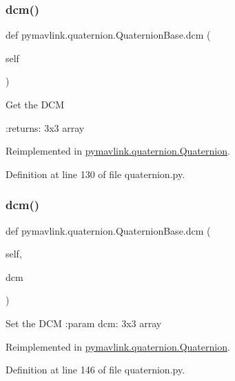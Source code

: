 \subsubsection{\texorpdfstring{dcm()}{dcm()}\hspace{0.1cm}{\footnotesize\ttfamily [1/2]}}
{\footnotesize\ttfamily def pymavlink.\+quaternion.\+Quaternion\+Base.\+dcm (\begin{DoxyParamCaption}\item[{}]{self }\end{DoxyParamCaption})}

\begin{DoxyVerb}Get the DCM

:returns: 3x3 array
\end{DoxyVerb}
 

Reimplemented in \mbox{\hyperlink{classpymavlink_1_1quaternion_1_1Quaternion_a8c596178af38be093dd787c609d7da09}{pymavlink.\+quaternion.\+Quaternion}}.



Definition at line 130 of file quaternion.\+py.

\mbox{\label{classpymavlink_1_1quaternion_1_1QuaternionBase_a2da4adc7fb783fe3d4e3c4d92f3ac91e}} 
\subsubsection{\texorpdfstring{dcm()}{dcm()}\hspace{0.1cm}{\footnotesize\ttfamily [2/2]}}
{\footnotesize\ttfamily def pymavlink.\+quaternion.\+Quaternion\+Base.\+dcm (\begin{DoxyParamCaption}\item[{}]{self,  }\item[{}]{dcm }\end{DoxyParamCaption})}

\begin{DoxyVerb}Set the DCM
:param dcm: 3x3 array\end{DoxyVerb}
 

Reimplemented in \mbox{\hyperlink{classpymavlink_1_1quaternion_1_1Quaternion_a2223bcf5392e9fc3980e012074318707}{pymavlink.\+quaternion.\+Quaternion}}.



Definition at line 146 of file quaternion.\+py.

